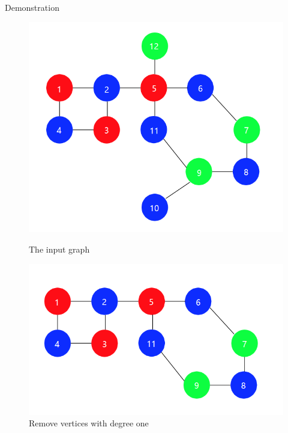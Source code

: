 \documentclass{beamer}
\begin{document}
\begin{frame}{Demonstration}
    \begin{figure}[htbp]
\centering
\begin{minipage}[t]{0.5\textwidth}
\centering
\includegraphics[width=1\textwidth]{figure/1.png}
\caption{The input graph}
\end{minipage}
\begin{minipage}[t]{0.48\textwidth}
\centering
\includegraphics[width=1\textwidth]{figure/2.png}
\caption{Remove vertices with degree one}
\end{minipage}
\end{figure}
\end{frame}
\end{document}

